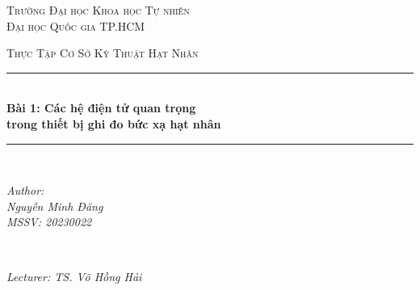 \documentclass[12pt]{article}
\begin{document}
\begin{titlepage}

\newcommand{\HRule}{\rule{\linewidth}{0.5mm}} %

\center %
 

\textsc{\LARGE Trường Đại học Khoa học Tự nhiên \\ Đại học Quốc gia TP.HCM}\\[1.5cm] %

\vspace{3cm}


\textsc{\Large Thực Tập Cơ Sở Kỹ Thuật Hạt Nhân}\\[0.5cm] %


\HRule \\[0.4cm]
{ \Large \bfseries Bài 1: Các hệ điện tử quan trọng \\ trong thiết bị ghi đo bức xạ hạt nhân}\\[0.4cm] %
\HRule \\[1.5cm]
 

\begin{minipage}{0.4\textwidth}
\begin{flushleft} \large
\emph{Author: \\ Nguyễn Minh Đăng \\ MSSV: 20230022}\\

\end{flushleft}
\end{minipage}
~
\begin{minipage}{0.4\textwidth}
\begin{flushright} \large
\emph{Lecturer: TS. Võ Hồng Hải} \\
\end{flushright}
\end{minipage}\\[2cm]


\end{titlepage}
\end{document}
